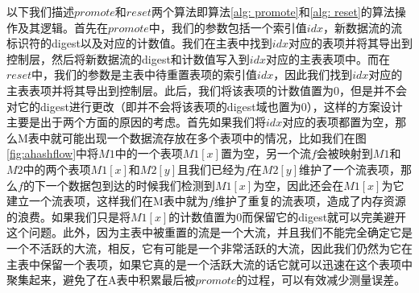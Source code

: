 \documentclass{article}
\begin{document}
以下我们描述$promote$和$reset$两个算法即算法\ref{alg: promote}和\ref{alg: reset}的算法操作及其逻辑。首先在$promote$中，我们的参数包括一个索引值$idx$，新数据流的流标识符的digest以及对应的计数值。我们在主表中找到$idx$对应的表项并将其导出到控制层，然后将新数据流的digest和计数值写入到$idx$对应的主表表项中。而在$reset$中，我们的参数是主表中待重置表项的索引值$idx$，因此我们找到$idx$对应的主表表项并将其导出到控制层。此后，我们将该表项的计数值置为0，但是并不会对它的digest进行更改（即并不会将该表项的digest域也置为0），这样的方案设计主要是出于两个方面的原因的考虑。首先如果我们将$idx$对应的表项都置为空，那么M表中就可能出现一个数据流存放在多个表项中的情况，比如我们在图\ref{fig:ahashflow}中将$M1$中的一个表项$M1[x]$置为空，另一个流$f$会被映射到$M1$和$M2$中的两个表项$M1[x]$和$M2[y]$且我们已经为$f$在$M2[y]$维护了一个流表项，那么$f$的下一个数据包到达的时候我们检测到$M1[x]$为空，因此还会在$M1[x]$为它建立一个流表项，这样我们在M表中就为$f$维护了重复的流表项，造成了内存资源的浪费。如果我们只是将$M1[x]$的计数值置为0而保留它的digest就可以完美避开这个问题。此外，因为主表中被重置的流是一个大流，并且我们不能完全确定它是一个不活跃的大流，相反，它有可能是一个非常活跃的大流，因此我们仍然为它在主表中保留一个表项，如果它真的是一个活跃大流的话它就可以迅速在这个表项中聚集起来，避免了在A表中积累最后被$promote$的过程，可以有效减少测量误差。
\end{document}
